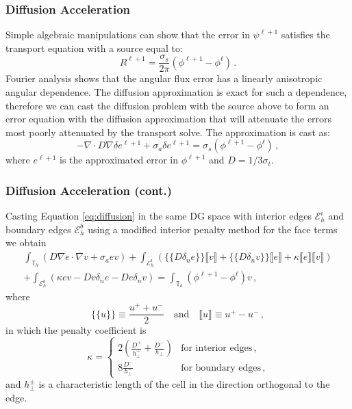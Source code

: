 \documentclass[xcolor={usenames,dvipsnames,svgnames,table}, 10pt]{beamer}
\begin{document}
\begin{frame}\frametitle{Diffusion Acceleration}
	Simple algebraic manipulations can show that the error in $\psi^{\ell + 1}$ satisfies the transport equation with a source equal to:
	\[
		R^{\ell + 1} = \frac{\sigma_s}{2\pi} (\phi^{\ell + 1} - \phi^\ell)\,.
	\]
	Fourier analysis shows that the angular flux error has a linearly anisotropic angular dependence. The diffusion approximation is exact for such a dependence, therefore we can cast the diffusion problem with the source above to form an error equation with the diffusion approximation that will attenuate the errors most poorly attenuated by the transport solve. The approximation is cast as:
	\begin{equation}
		\label{eq:diffusion}
		-\nabla \cdot D \nabla \delta e^{\ell + 1} + \sigma_a \delta e^{\ell + 1} = \sigma_s \left( \phi^{\ell + 1} - \phi^\ell\right)\,,
	\end{equation}
	where $e^{\ell+1}$ is the approximated error in $\phi^{\ell + 1}$ and $D = 1/3 \sigma_t$.
\end{frame}


\begin{frame}\frametitle{Diffusion Acceleration (cont.)}
	Casting Equation \eqref{eq:diffusion} in the same DG space with interior edges $\mathcal{E}_h^i$ and boundary edges $\mathcal{E}_h^b$ using a modified interior penalty method for the face terms we obtain
	\begin{multline}
		\int_{\mathbb{T}_h} (D \nabla e \cdot \nabla v + \sigma_a e v) + \int_{\mathcal{E}_h^i} \left( \{\!\!\{ D \delta_n e \}\!\!\} \llbracket v \rrbracket + \{\!\!\{ D \delta_n v \}\!\!\} \llbracket e \rrbracket + \kappa \llbracket e \rrbracket \llbracket v \rrbracket \right) \\
		+ \int_{\mathcal{E}_h^b} \left( \kappa e v - D v \delta_n e - D e \delta_n v \right) = \int_{\mathbb{T}_h} (\phi^{\ell + 1} - \phi^\ell) v\,,
	\end{multline}
	where
	\[
		\{\!\!\{ u \}\!\!\} \equiv \frac{u^+ + u^-}{2} \quad \text{and} \quad \llbracket u \rrbracket \equiv u^+ - u^-\,,
	\]
	in which the penalty coefficient is
	\[
		\kappa = \begin{cases} 2 \left(\frac{D^+}{h^+_\bot} + \frac{D^-}{h^-_\bot}\right) & \text{for~interior~edges}\,, \\ 8 \frac{D^-}{h^-_\bot} & \text{for~boundary~edges}\,, \end{cases}
	\]
	and $h^\pm_\bot$ is a characteristic length of the cell in the direction orthogonal to the edge.
\end{frame}
\end{document}
